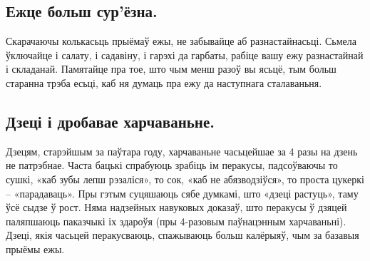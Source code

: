 \subsection{Ежце больш сур'ёзна.}
Скарачаючы колькасьць прыёмаў ежы, не забывайце аб разнастайнасьці. Сьмела ўключайце і салату, і садавіну, і гарэхі да гарбаты, рабіце вашу ежу разнастайнай і складанай. Памятайце пра тое, што чым менш разоў вы ясьцё, тым больш старанна трэба есьці, каб ня думаць пра ежу да наступнага сталаваньня.

\subsection{Дзеці і дробавае харчаваньне.}
Дзецям, старэйшым за паўтара году, харчаваньне часьцейшае за 4 разы на дзень не патрэбнае. Часта бацькі спрабуюць зрабіць ім перакусы, падсоўваючы то сушкі, «каб зубы лепш рэзаліся», то сок, «каб не абязводзіўся», то проста цукеркі – «парадаваць». Пры гэтым суцяшаюць сябе думкамі, што «дзеці растуць», таму ўсё сыдзе ў рост. Няма надзейных навуковых доказаў, што перакусы ў дзяцей паляпшаюць паказчыкі іх здароўя (пры 4-разовым паўнацэнным харчаваньні). Дзеці, якія часьцей  перакусваюць, спажываюць больш калёрыяў, чым за базавыя прыёмы ежы.
